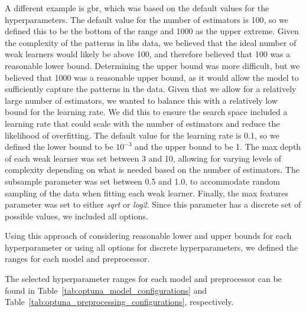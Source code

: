 A different example is \gls{gbr}, which was based on the default values for the hyperparameters.
The default value for the number of estimators is 100, so we defined this to be the bottom of the range and 1000 as the upper extreme. 
Given the complexity of the patterns in \gls{libs} data, we believed that the ideal number of weak learners would likely be above 100, and therefore believed that 100 was a reasonable lower bound. 
Determining the upper bound was more difficult, but we believed that 1000 was a reasonable upper bound, as it would allow the model to sufficiently capture the patterns in the data. 
Given that we allow for a relatively large number of estimators, we wanted to balance this with a relatively low bound for the learning rate. 
We did this to ensure the search space included a learning rate that could scale with the number of estimators and reduce the likelihood of overfitting. 
The default value for the learning rate is 0.1, so we defined the lower bound to be $10^{-3}$ and the upper bound to be 1. 
The max depth of each weak learner was set between 3 and 10, allowing for varying levels of complexity depending on what is needed based on the number of estimators. 
The subsample parameter was set between 0.5 and 1.0, to accommodate random sampling of the data when fitting each weak learner. 
Finally, the max features parameter was set to either \textit{sqrt} or \textit{log2}. Since this parameter has a discrete set of possible values, we included all options.

Using this approach of considering reasonable lower and upper bounds for each hyperparameter or using all options for discrete hyperparameters, we defined the ranges for each model and preprocessor.

The selected hyperparameter ranges for each model and preprocessor can be found in Table~\ref{tab:optuna_model_configurations} and Table~\ref{tab:optuna_preprocessing_configurations}, respectively.


